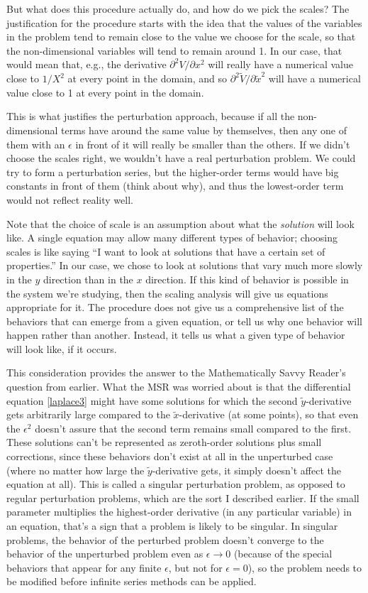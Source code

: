 \documentclass[11pt]{book}
\begin{document}
But what does this procedure actually do, and how do we pick the scales?  The justification for the procedure starts with the idea that the values of the variables in the problem tend to remain close to the value we choose for the scale, so that the non-dimensional variables will tend to remain around 1.  In our case, that would mean that, e.g., the derivative $\partial^2 V / \partial x^2$ will really have a numerical value close to $1/X^2$ at every point in the domain, and so $\partial^2 \tilde{V} / \partial \tilde{x}^2$ will have a numerical value close to 1 at every point in the domain.

This is what justifies the perturbation approach, because if all the non-dimensional terms have around the same value by themselves, then any one of them with an $\epsilon$ in front of it will really be smaller than the others.  If we didn't choose the scales right, we wouldn't have a real perturbation problem.  We could try to form a perturbation series, but the higher-order terms would have big constants in front of them (think about why), and thus the lowest-order term would not reflect reality well.

Note that the choice of scale is an assumption about what the \emph{solution} will look like.  A single equation may allow many different types of behavior; choosing scales is like saying ``I want to look at solutions that have a certain set of properties.''  In our case, we chose to look at solutions that vary much more slowly in the $y$ direction than in the $x$ direction.  If this kind of behavior is possible in the system we're studying, then the scaling analysis will give us equations appropriate for it.  The procedure does not give us a comprehensive list of the behaviors that can emerge from a given equation, or tell us why one behavior will happen rather than another.  Instead, it tells us what a given type of behavior will look like, if it occurs.

This consideration provides the answer to the Mathematically Savvy Reader's question from earlier.  What the MSR was worried about is that the differential equation \eqref{laplace3} might have some solutions for which the second $\tilde{y}$-derivative gets arbitrarily large compared to the $\tilde{x}$-derivative (at some points), so that even the $\epsilon^2$ doesn't assure that the second term remains small compared to the first.  These solutions can't be represented as zeroth-order solutions plus small corrections, since these behaviors don't exist at all in the unperturbed case (where no matter how large the $\tilde{y}$-derivative gets, it simply doesn't affect the equation at all).  This is called a singular perturbation problem, as opposed to regular perturbation problems, which are the sort I described earlier.  If the small parameter multiplies the highest-order derivative (in any particular variable) in an equation, that's a sign that a problem is likely to be singular.  In singular problems, the behavior of the perturbed problem doesn't converge to the behavior of the unperturbed problem even as $\epsilon \rightarrow 0$ (because of the special behaviors that appear for any finite $\epsilon$, but not for $\epsilon = 0$), so the problem needs to be modified before infinite series methods can be applied.
\end{document}
